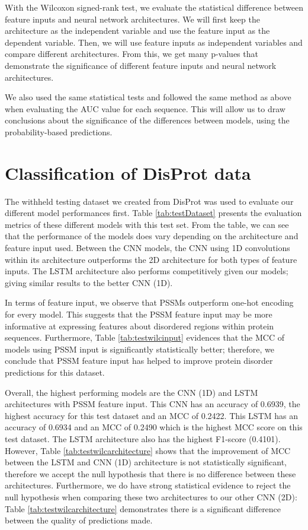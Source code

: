 \documentclass{l4proj}
\begin{document}
With the Wilcoxon signed-rank test, we evaluate the statistical difference between feature inputs and neural network architectures. We will first keep the architecture as the independent variable and use the feature input as the dependent variable. Then, we will use feature inputs as independent variables and compare different architectures. From this, we get many p-values that demonstrate the significance of different feature inputs and neural network architectures.

We also used the same statistical tests and followed the same method as above when evaluating the AUC value for each sequence. This will allow us to draw conclusions about the significance of the differences between models, using the probability-based predictions.

\section{Classification of DisProt data}
\label{chap:eval sec:test}

The withheld testing dataset we created from DisProt \citep{disprot} was used to evaluate our different model performances first. Table \ref{tab:testDataset} presents the evaluation metrics of these different models with this test set. From the table, we can see that the performance of the models does vary depending on the architecture and feature input used. Between the CNN models, the CNN using 1D convolutions within its architecture outperforms the 2D architecture for both types of feature inputs. The LSTM architecture also performs competitively given our models; giving similar results to the better CNN (1D).

In terms of feature input, we observe that PSSMs outperform one-hot encoding for every model. This suggests that the PSSM feature input may be more informative at expressing features about disordered regions within protein sequences. Furthermore, Table \ref{tab:testwilcinput} evidences that the MCC of models using PSSM input is significantly statistically better; therefore, we conclude that PSSM feature input has helped to improve protein disorder predictions for this dataset.

Overall, the highest performing models are the CNN (1D) and LSTM architectures with PSSM feature input. This CNN has an accuracy of 0.6939, the highest accuracy for this test dataset and an MCC of 0.2422. This LSTM has an accuracy of 0.6934 and an MCC of 0.2490 which is the highest MCC score on this test dataset. The LSTM architecture also has the highest F1-score (0.4101). However, Table \ref{tab:testwilcarchitecture} shows that the improvement of MCC between the LSTM and CNN (1D) architecture is not statistically significant, therefore we accept the null hypothesis that there is no difference between these architectures. Furthermore, we do have strong statistical evidence to reject the null hypothesis when comparing these two architectures to our other CNN (2D): Table \ref{tab:testwilcarchitecture} demonstrates there is a significant difference between the quality of predictions made.
\end{document}
